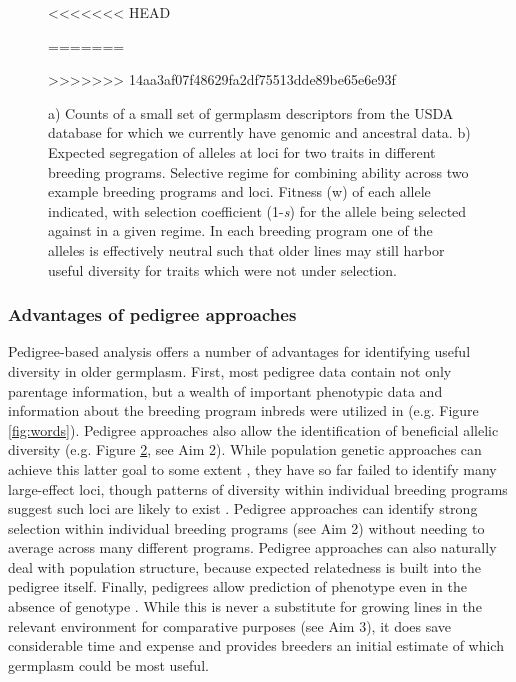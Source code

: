 \documentclass[12pt]{article}
\begin{document}
\begin{figure}[t]
\begin{subfigure}[b]{0.5\textwidth}
                \label{fig:div}
        \end{subfigure}
<<<<<<< HEAD
\caption{a) Counts of a small set of germplasm descriptors from the USDA database for which we currently have genomic and ancestral data. b) Expected segregation of alleles at loci for two traits in different breeding programs.  Selective regime for combining ability across two example breeding programs and loci. Fitness (w) of each allele indicated, with selection coefficient (1-\textit{s}) for the allele being selected against in a given regime. Locus 2, though beneficial under drought conditions, risks loss due to drift in breeding programs focusing only on combining ability.}
=======
\caption{a) Counts of a small set of germplasm descriptors from the USDA database for which we currently have genomic and ancestral data. b) Expected segregation of alleles at loci for two traits in different breeding programs.  Selective regime for combining ability across two example breeding programs and loci. Fitness (w) of each allele indicated, with selection coefficient (1-\textit{s}) for the allele being selected against in a given regime. In each breeding program one of the alleles is effectively neutral such that older lines may still harbor useful diversity for traits which were not under selection.}
>>>>>>> 14aa3af07f48629fa2df75513dde89be65e6e93f
\end{figure}
 
\subsubsection*{Advantages of pedigree approaches}

Pedigree-based analysis offers a number of advantages for identifying useful diversity in older germplasm.
First, most pedigree data contain not only parentage information, but a wealth of important phenotypic data and information about the breeding program inbreds were utilized in (e.g. Figure \ref{fig:words}). 
Pedigree approaches also allow the identification of beneficial allelic diversity (e.g. Figure \ref{fig:div}, see Aim 2).
While population genetic approaches can achieve this latter goal to some extent \citep[e.g.][]{van2012historical}, they have so far failed to identify many large-effect loci, though patterns of diversity within individual breeding programs suggest such loci are likely to exist \citep{Gerke:2013tw}.
Pedigree approaches can identify strong selection within individual breeding programs (see Aim 2) without needing to average across many different programs.  
Pedigree approaches can also naturally deal with population structure, because expected relatedness is built into the pedigree itself.
Finally, pedigrees allow prediction of phenotype even in the absence of genotype \citep{piepho2008blup}.  
While this is never a substitute for growing lines in the relevant environment for comparative purposes (see Aim 3), it does save considerable time and expense and provides breeders an initial estimate of which germplasm could be most useful.
\end{document}
